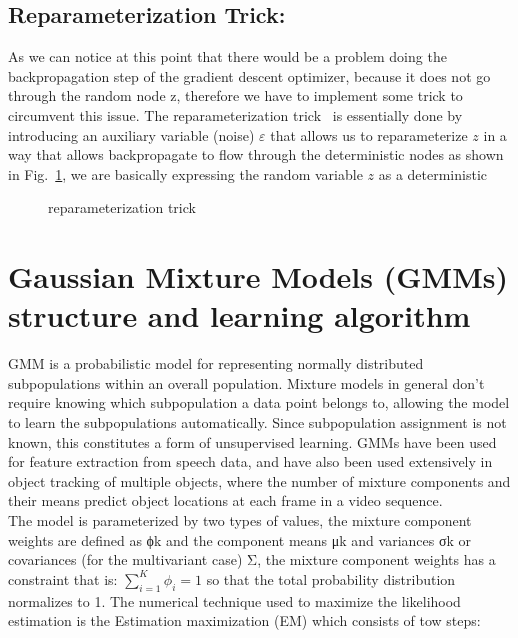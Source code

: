 \subsection{Reparameterization Trick:}
As we can notice at this point that there would be a problem doing the backpropagation step of the gradient descent optimizer, because it does not go through the random node z, therefore we have to implement some trick to circumvent this issue. The reparameterization trick~\cite{kingma2013auto} is essentially done by introducing an auxiliary variable (noise) $\varepsilon$ that allows us to reparameterize $z$ in a way that allows backpropagate to flow through the deterministic nodes as shown in Fig.~\ref{fig:paratrick}, we are basically expressing the random variable $z$ as a deterministic 

\begin{figure}
	\centerline
	\paratrick
	\caption{reparameterization trick}
	\label{fig:paratrick}
\end{figure} 

\section{Gaussian Mixture Models (GMMs) structure and learning algorithm}
GMM is a probabilistic model for representing normally distributed subpopulations within an overall population. Mixture models in general don't require knowing which subpopulation a data point belongs to, allowing the model to learn the subpopulations automatically. Since subpopulation assignment is not known, this constitutes a form of unsupervised learning. GMMs have been used for feature extraction from speech data, and have also been used extensively in object tracking of multiple objects, where the number of mixture components and their means predict object locations at each frame in a video sequence.\\
The model is parameterized by two types of values, the mixture component weights are defined as ϕk and the component means μk and variances σk or covariances (for the multivariant case) Σ, the mixture component weights has a constraint that is:  $\sum_{i=1}^{K} \phi_i = 1$ so that the total probability distribution normalizes to 1. The numerical technique used to maximize the likelihood estimation is the Estimation maximization (EM) which consists of tow steps:

